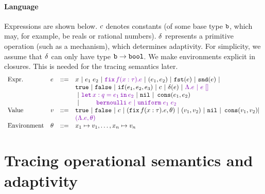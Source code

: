 \documentclass[a4paper,11pt]{article}
\newcommand{\wq}[1]{\textcolor[rgb]{.50,0.0,0.7}{ #1}}
\theoremstyle{definition}
\begin{document}
\paragraph{Language}
Expressions are shown below. $c$ denotes constants (of some base
type $\mathtt{b}$, which may, for example, be reals or rational
numbers). $\delta$ represents a primitive operation (such as a
mechanism), which determines adaptivity. For simplicity, we assume
that $\delta$ can only have type $\mathtt{b} \to \mathtt{bool}$. We make
environments explicit in closures. This is needed for the tracing
semantics later.
\[\begin{array}{llll}
\mbox{Expr.} & \expr & ::= & x ~|~ \expr_1 \eapp \expr_2 ~|~ \wq{\efix f(x:\type).\expr}
 ~|~ (\expr_1, \expr_2) ~|~ \eprojl(\expr) ~|~ \eprojr(\expr) ~| \\
%
& & & \etrue ~|~ \efalse ~|~ \eif(\expr_1, \expr_2, \expr_3) ~|~
\econst ~|~ \eop(\expr)  ~|~ \wq {\eilam \expr ~|~ \expr \eapp [] } \\
& & & ~|~ \wq {\elet  x:q = \expr_1 \ein \expr_2 } ~|~ \enil ~|~  \econs (
      \expr_1, \expr_2) \\
& & & ~|~ \wq{ ~~~~~~~
 \bernoulli \eapp \expr ~|~ \uniform \eapp \expr_1 \eapp
      \expr_2 } \\
%
\mbox{Value} & \valr & ::= & \etrue ~|~ \efalse ~|~ \econst ~|~
(\efix f(x:\type).\expr, \env) ~|~ (\valr_1, \valr_2) 
    ~|~ \enil ~|~ \econs (\valr_1, \valr_2) | \\
& & & \wq {(\eilam \expr , \env) } \\ 
%
\mbox{Environment} & \env & ::= & x_1 \mapsto \valr_1, \ldots, x_n \mapsto \valr_n
\end{array}\]





\section{Tracing operational semantics and adaptivity}
\end{document}
